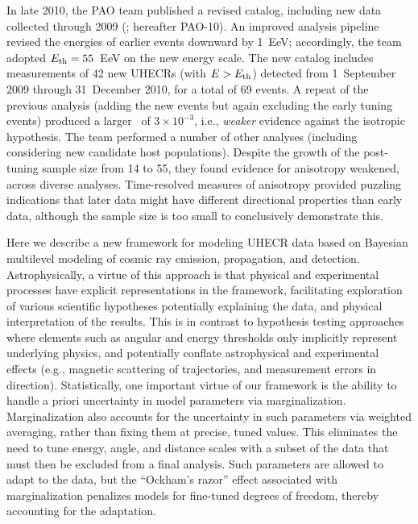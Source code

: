 
In late 2010, the PAO team published a revised catalog, including new data
collected through 2009 (\cite{PAO10-AnisoUpdate}; hereafter PAO-10).  An
improved analysis pipeline revised the energies of earlier events downward
by 1~EeV; accordingly, the team adopted $E_{\rm th} = 55$~EeV on the new energy
scale.  The new catalog includes measurements of 42 new UHECRs (with $E>E_{\rm th}$)
detected from 1~September 2009 through 31~December 2010, for a total of 69
events.  A repeat of the previous analysis (adding the new events but again
excluding the early tuning events) produced a larger \pval\ of
$3\times 10^{-3}$, i.e., {\em weaker} evidence against the isotropic
hypothesis.  The team performed a number of other analyses (including
considering new candidate host populations).  Despite the growth of the
post-tuning sample size from 14 to 55, they found evidence for anisotropy
weakened, across diverse analyses.  Time-resolved measures of anisotropy
provided puzzling indications that later data might have different directional
properties than early data, although the sample size is too small to
conclusively demonstrate this.

Here we describe a new framework for modeling UHECR data based on Bayesian
multilevel modeling of cosmic ray emission, propagation, and detection.
Astrophysically, a virtue of this approach is that physical and experimental
processes have explicit representations in the framework, facilitating
exploration of various scientific hypotheses potentially explaining the
data, and physical interpretation of the results.  This is in contrast to
hypothesis testing approaches where elements such as angular and energy
thresholds only implicitly represent underlying physics, and potentially
conflate astrophysical and experimental effects (e.g., magnetic scattering
of trajectories, and measurement errors in direction).
Statistically, one important virtue of our framework is the ability to
handle a priori uncertainty in model parameters via marginalization. 
Marginalization also accounts for the uncertainty in such parameters via
weighted averaging, rather than fixing them at precise, tuned values.  This
eliminates the need to tune energy, angle, and distance scales with a subset
of the data that must then be excluded from a final analysis.  Such parameters
are allowed to adapt to the data, but the ``Ockham's razor'' effect associated
with marginalization penalizes models for fine-tuned degrees of freedom,
thereby accounting for the adaptation.


